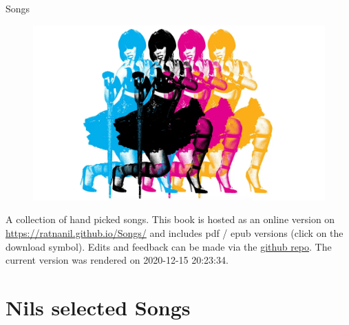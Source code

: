 \documentclass[
]{book}
\author{}
\date{\vspace{-2.5em}}
\begin{document}

\begin{titlepage}
\begin{center}
  

\end{center}
\vspace{1.5cm}
\begin{center}

{\LARGE Songs}

\end{center}
 \vspace{1cm}

\begin{figure}[htbp]
  \centering
  \includegraphics[width=1\textwidth]{misc/title.png}
  \label{titelbild}
\end{figure}

\begin{center}
\textbf{}


\end{center} 

\vspace{1.0cm}


\end{titlepage}

{
\setcounter{tocdepth}{1}
\tableofcontents
}
A collection of hand picked songs. This book is hosted as an online version on \url{https://ratnanil.github.io/Songs/} and includes pdf / epub versions (click on the download symbol). Edits and feedback can be made via the \href{https://github.com/ratnanil/songs}{github repo}. The current version was rendered on 2020-12-15 20:23:34.

\hypertarget{nils-selected-songs}{%
\chapter{Nils selected Songs}\label{nils-selected-songs}}
\end{document}

